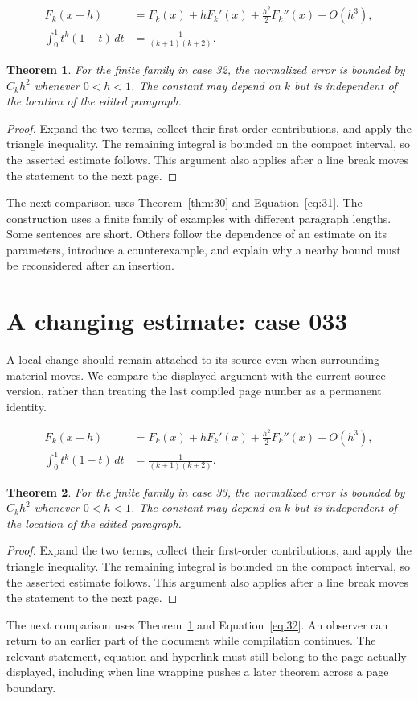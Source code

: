 \documentclass[a4paper,10pt]{article}
\newtheorem{theorem}{Theorem}[section]
\begin{document}
\lipsum[4-5]
\begin{align}\label{eq:31}
 F_k(x+h)&=F_k(x)+hF_k'(x)+\frac{h^2}{2}F_k''(x)+O(h^3),\\
 \int_0^1 t^k(1-t)\,dt&=\frac{1}{(k+1)(k+2)}.
\end{align}
\begin{theorem}\label{thm:31}
For the finite family in case 32, the normalized error is bounded by $C_k h^2$ whenever $0<h<1$. The constant may depend on $k$ but is independent of the location of the edited paragraph.
\end{theorem}
\begin{proof}
Expand the two terms, collect their first-order contributions, and apply the
triangle inequality. The remaining integral is bounded on the compact interval,
so the asserted estimate follows. This argument also applies after a line break
moves the statement to the next page.
\end{proof}
The next comparison uses Theorem~\ref{thm:30} and Equation~\ref{eq:31}. The construction uses a finite family of examples with different paragraph lengths. Some sentences are short. Others follow the dependence of an estimate on its parameters, introduce a counterexample, and explain why a nearby bound must be reconsidered after an insertion.

\lipsum[8]

\section{A changing estimate: case 033}\label{unit:32}
A local change should remain attached to its source even when surrounding material moves. We compare the displayed argument with the current source version, rather than treating the last compiled page number as a permanent identity.

\lipsum[7-8]
\begin{align}\label{eq:32}
 F_k(x+h)&=F_k(x)+hF_k'(x)+\frac{h^2}{2}F_k''(x)+O(h^3),\\
 \int_0^1 t^k(1-t)\,dt&=\frac{1}{(k+1)(k+2)}.
\end{align}
\begin{theorem}\label{thm:32}
For the finite family in case 33, the normalized error is bounded by $C_k h^2$ whenever $0<h<1$. The constant may depend on $k$ but is independent of the location of the edited paragraph.
\end{theorem}
\begin{proof}
Expand the two terms, collect their first-order contributions, and apply the
triangle inequality. The remaining integral is bounded on the compact interval,
so the asserted estimate follows. This argument also applies after a line break
moves the statement to the next page.
\end{proof}
The next comparison uses Theorem~\ref{thm:31} and Equation~\ref{eq:32}. An observer can return to an earlier part of the document while compilation continues. The relevant statement, equation and hyperlink must still belong to the page actually displayed, including when line wrapping pushes a later theorem across a page boundary.
\end{document}

